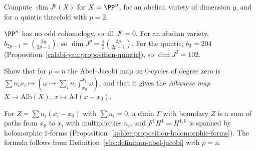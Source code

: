 \begin{exercise}\label{vhs:exercise-dimension}
Compute $\dim J^p(X)$ for $X = \PP^n$, for an abelian variety of dimension $g$, and for a quintic threefold with $p = 2$.
\end{exercise}

\begin{solution}
$\PP^n$ has no odd cohomology, so all $J^p = 0$. For an abelian variety, $b_{2p-1} = \binom{2g}{2p-1}$, so $\dim J^p = \frac12\binom{2g}{2p-1}$. For the quintic, $b_3 = 204$
(Proposition~\ref{calabi-yau:proposition-quintic}), so $\dim J^2 = 102$.
\end{solution}

\begin{exercise}\label{vhs:exercise-aj-points}
Show that for $p = n$ the Abel--Jacobi map on $0$-cycles of degree zero is $\sum n_ix_i \mapsto (\omega \mapsto \sum_in_i\int_{x_0}^{x_i}\omega)$, and that it gives the \emph{Albanese map}
$X \to \mathrm{Alb}(X)$, $x \mapsto \mathrm{AJ}(x - x_0)$.
\end{exercise}

\begin{solution}
For $Z = \sum n_i(x_i - x_0)$ with $\sum n_i = 0$, a chain $\Gamma$ with boundary $Z$ is a sum of paths from $x_0$ to $x_i$ with multiplicities $n_i$, and $F^1H^1 = H^{1,0}$ is spanned by holomorphic
$1$-forms (Proposition~\ref{kahler:proposition-holomorphic-forms}). The formula follows from Definition~\ref{vhs:definition-abel-jacobi} with $p = n$.
\end{solution}
